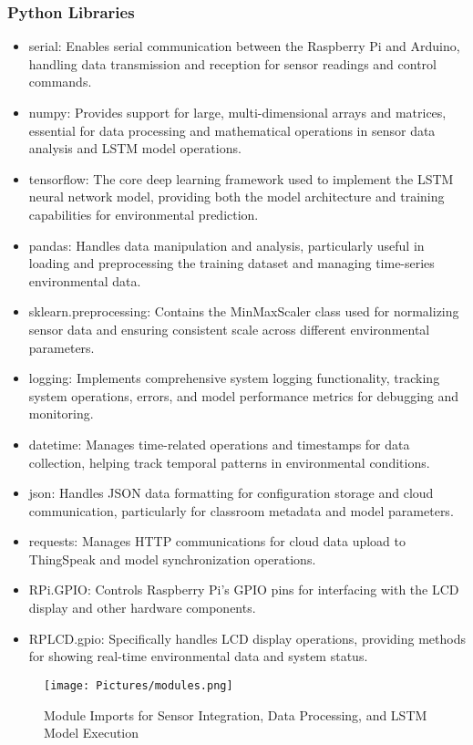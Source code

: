 \subsubsection{Python Libraries}
\begin{itemize}
    \item serial: Enables serial communication between the Raspberry Pi and Arduino, handling data transmission and reception for sensor readings and control commands.
    \item numpy: Provides support for large, multi-dimensional arrays and matrices, essential for data processing and mathematical operations in sensor data analysis and LSTM model operations.
    \item tensorflow: The core deep learning framework used to implement the LSTM neural network model, providing both the model architecture and training capabilities for environmental prediction.
    \item pandas: Handles data manipulation and analysis, particularly useful in loading and preprocessing the training dataset and managing time-series environmental data.
    \item sklearn.preprocessing: Contains the MinMaxScaler class used for normalizing sensor data and ensuring consistent scale across different environmental parameters.
    \item logging: Implements comprehensive system logging functionality, tracking system operations, errors, and model performance metrics for debugging and monitoring.
    \item datetime: Manages time-related operations and timestamps for data collection, helping track temporal patterns in environmental conditions.
    \item json: Handles JSON data formatting for configuration storage and cloud communication, particularly for classroom metadata and model parameters.
    \item requests: Manages HTTP communications for cloud data upload to ThingSpeak and model synchronization operations.
    \item RPi.GPIO: Controls Raspberry Pi's GPIO pins for interfacing with the LCD display and other hardware components.
    \item RPLCD.gpio: Specifically handles LCD display operations, providing methods for showing real-time environmental data and system status.
\end{itemize}
\begin{figure}[h!]
		\centering
	\texttt{[image: Pictures/modules.png]}
		\caption{Module Imports for Sensor Integration, Data Processing, and LSTM Model Execution}
\end{figure}

